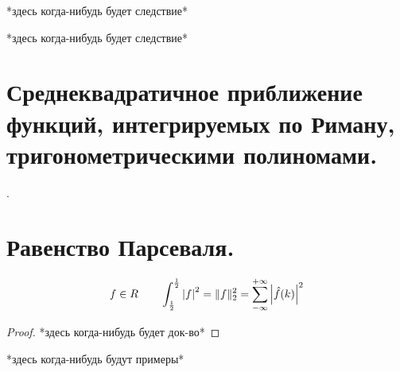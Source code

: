 \documentclass[matan]{subfiles}
\begin{document}
  \begin{consequence}[3]
    *здесь когда-нибудь будет следствие*
  \end{consequence}

  \begin{consequence}[4]
    *здесь когда-нибудь будет следствие*
  \end{consequence}

  \newpage
  \section{Среднеквадратичное приближение функций, интегрируемых по Риману, тригонометрическими полиномами.}
  \begin{consequence}
    .
  \end{consequence}

  \newpage
  \section{Равенство Парсеваля.}
  \begin{consequence}
    \[f \in R \qquad \int_{\frac{1}{2}}^{\frac{1}{2}} \left|f\right|^2 = \lVert f \rVert^2_2 = \sum_{-\infty}^{+\infty} \left|\hat{f}(k)\right|^2\]
  \end{consequence}

  \begin{proof}
    *здесь когда-нибудь будет док-во*
  \end{proof}

  \begin{examples}
    *здесь когда-нибудь будут примеры*
  \end{examples}
\end{document}
